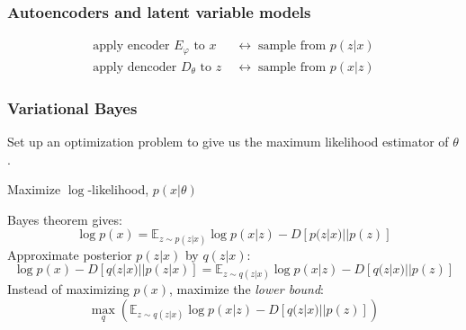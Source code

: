 \documentclass[xcolor={dvipsnames}]{beamer}
\renewcommand{\phi}{\varphi}
\newcommand{\df}[1]{\textcolor{BrickRed}{\emph{#1}}}
\newcommand{\cX}{\mathcal{X}}
\newcommand{\cZ}{\mathcal{Z}}
\newcommand{\EE}{\mathbb{E}}
\begin{document}
\begin{frame}
    \frametitle{Autoencoders and latent variable models}
    \setlength\parskip{1em}
    \begin{align*}
        \text{apply encoder $E_\phi$ to $x$}&\;\longleftrightarrow\;
        \text{sample from $p(z|x)$}\\[3ex]
        \text{apply dencoder $D_\theta$ to $z$}&\;\longleftrightarrow\;
        \text{sample from $p(x|z)$}
    \end{align*}



    
\end{frame}


\begin{frame}
    \frametitle{Variational Bayes}
    \setlength\parskip{1em}

    Set up an optimization problem to give us the maximum likelihood estimator of $\theta$.

    Maximize $\log$-likelihood, $p(x|\theta)$

    Bayes theorem gives:
    \[
        \log p(x) = \EE_{z\sim p(z|x)}\log p(x|z) - D[p(z|x)||p(z)]
    \]
    Approximate posterior $p(z|x)$ by $q(z|x)$:
    \[
        \log p(x) - D[q(z|x)||p(z|x)] = \EE_{z\sim q(z|x)}\log p(x|z) - D[q(z|x)||p(z)]
    \]
    Instead of maximizing $p(x)$, maximize the \df{lower bound}:
    \[
        \max_q\left(\EE_{z\sim q(z|x)}\log p(x|z) - D[q(z|x)||p(z)]\right)%
    \]
    

\end{frame}
\end{document}
